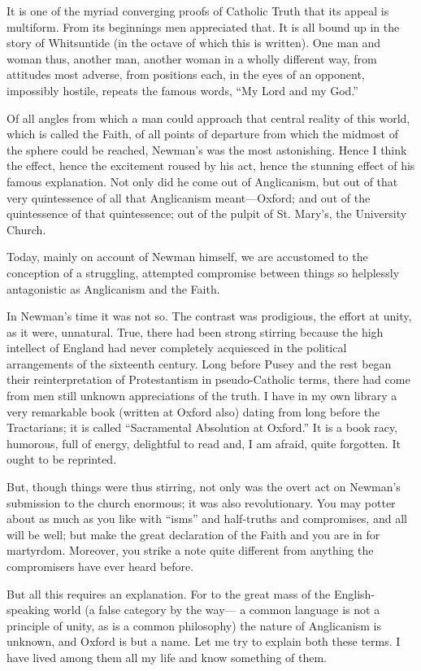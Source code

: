 It is one of the myriad converging proofs of
Catholic Truth that its appeal is multiform. From its beginnings men
appreciated that. It is all bound up in the story of Whitsuntide (in the
octave of which this is written). One man and woman thus, another man,
another woman in a wholly different way, from attitudes most adverse,
from positions each, in the eyes of an opponent, impossibly hostile,
repeats the famous words, ``My Lord and my God.''

Of all angles from which a man could approach that
central reality of this world, which is called the Faith, of all points
of departure from which the midmost of the sphere could be reached,
Newman's was the most astonishing. Hence I think the effect, hence the
excitement roused by his act, hence the stunning effect of his famous
explanation. Not only did he come out of Anglicanism, but out of that
very quintessence of all that Anglicanism meant—Oxford; and out of the
quintessence of that quintessence; out of the pulpit of St. Mary's, the
University Church.

Today, mainly on account of Newman himself, we are
accustomed to the conception of a struggling, attempted compromise
between things so helplessly antagonistic as Anglicanism and the Faith.

In Newman's time it was not so. The contrast was
prodigious, the effort at unity, as it were, unnatural. True, there had
been strong stirring because the high intellect of England had never
completely acquiesced in the political arrangements of the sixteenth
century. Long before Pusey and the rest began their reinterpretation of
Protestantism in pseudo-Catholic terms, there had come from men still
unknown appreciations of the truth. I have in my own library a very
remarkable book (written at Oxford also) dating from long before the
Tractarians; it is called ``Sacramental Absolution at Oxford.'' It is a book
racy, humorous, full of energy, delightful to read and, I am afraid,
quite forgotten. It ought to be reprinted.

But, though things were thus stirring, not only was
the overt act on Newman's submission to the church enormous; it was also
revolutionary. You may potter about as much as you like with ``isms'' and
half-truths and compromises, and all will be well; but make the great
declaration of the Faith and you are in for martyrdom. Moreover, you
strike a note quite different from anything the compromisers have ever
heard before.

But all this requires an explanation. For to the
great mass of the English-speaking world (a false category by the way—
a common language is not a principle of unity, as is a common
philosophy) the nature of Anglicanism is unknown, and Oxford is but a
name. Let me try to explain both these terms. I have lived among them
all my life and know something of them.

